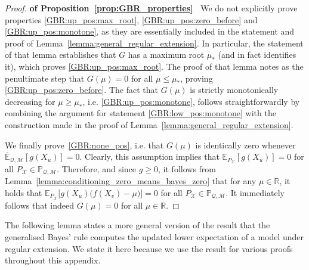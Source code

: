 \documentclass[twoside,11pt]{article}
\newcommand{\reals}{\mathbb{R}}
\newcommand{\states}{\mathcal{X}}
\newcommand{\uexp}{\overline{\mathbb{E}}_{\rateset,\mathcal{M}}}
\newcommand{\rateset}{\mathcal{Q}}
\begin{document}
\begin{proof}{\bf of Proposition~\ref{prop:GBR_properties}~}
We do not explicitly prove properties \ref{GBR:up_pos:max_root}, \ref{GBR:up_pos:zero_before} and \ref{GBR:up_pos:monotone}, as they are essentially included in the statement and proof of Lemma~\ref{lemma:general_regular_extension}. In particular, the statement of that lemma establishes that $G$ has a maximum root $\mu_*$ (and in fact identifies it), which proves \ref{GBR:up_pos:max_root}. The proof of that lemma notes as the penultimate step that $G(\mu)=0$ for all $\mu\leq \mu_*$, proving \ref{GBR:up_pos:zero_before}. The fact that $G(\mu)$ is strictly monotonically decreasing for $\mu\geq \mu_*$, i.e. \ref{GBR:up_pos:monotone}, follows straightforwardly by combining the argument for statement \ref{GBR:low_pos:monotone} with the construction made in the proof of Lemma~\ref{lemma:general_regular_extension}.

We finally prove~\ref{GBR:none_pos}, i.e. that $G(\mu)$ is identically zero whenever $\uexp[g(X_u)]=0$. Clearly, this assumption implies that $\mathbb{E}_{P_\states}[g(X_u)]=0$ for all $P_\states\in\mathbb{P}_{\rateset,\mathcal{M}}$. Therefore, and since $g\geq 0$, it follows from Lemma~\ref{lemma:conditioning_zero_means_bayes_zero} that for any $\mu\in\reals$, it holds that $\mathbb{E}_{P_\states}\bigl[g(X_u)\bigl(f(X_v) - \mu\bigr)\bigr]=0$ for all $P_\states\in\mathbb{P}_{\rateset,\mathcal{M}}$. It immediately follows that indeed $G(\mu)=0$ for all $\mu\in\reals$.
\end{proof}

The following lemma states a more general version of the result that the generalised Bayes' rule computes the updated lower expectation of a model under regular extension. We state it here because we use the result for various proofs throughout this appendix.
\end{document}
